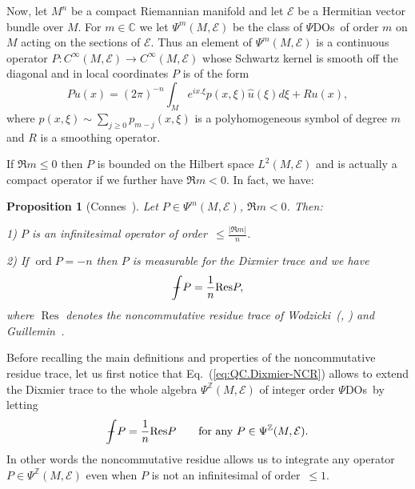 \documentclass[leqno, 10pt]{amsart}
\newtheorem{proposition}[definition]{Proposition}
\theoremstyle{remark}
\begin{document}
Now, let $M^{n}$ be a compact Riemannian manifold and let ${{\ensuremath{\mathcal{{E}}}}}$ be a Hermitian vector bundle over $M$. For $m \in {\ensuremath{\mathbb{C}}}$ we let $\Psi^{m}(M,{{\ensuremath{\mathcal{{E}}}}})$ be the 
class of {$\Psi$DOs}\ of order $m$ on $M$ acting on the sections of ${{\ensuremath{\mathcal{{E}}}}}$. Thus an element of $\Psi^{m}(M,{{\ensuremath{\mathcal{{E}}}}})$ is a continuous operator 
$P:C^{\infty}(M,{{\ensuremath{\mathcal{{E}}}}})\rightarrow C^{\infty}(M,{{\ensuremath{\mathcal{{E}}}}})$ whose Schwartz kernel is smooth off the diagonal and in local coordinates $P$ is of the form
\begin{equation}
    Pu(x)=(2\pi)^{-n}\int_{M}e^{ix.\xi}p(x,\xi)\hat{u}(\xi)d\xi +Ru(x),
\end{equation}
where $p(x,\xi)\sim \sum_{j\geq 0} p_{m-j}(x,\xi)$ is a polyhomogeneous symbol of degree $m$ and $R$ is a smoothing operator. 

If $\Re m\leq 0$ then $P$ is bounded on the Hilbert space $L^{2}(M,{{\ensuremath{\mathcal{{E}}}}})$ and is actually a compact operator if we further have $\Re m<0$. In fact, we have: 

\begin{proposition}[Connes~\cite{Co:AFNCG}]\label{prop:QC.Dixmier-trace} 
    Let $P\in \Psi^{m}(M,{{\ensuremath{\mathcal{{E}}}}})$, $\Re m<0$. Then:\smallskip
    
    1) $P$ is an infinitesimal operator of order~$\leq \frac{|\Re m|}{n}$.\smallskip
    
    2) If ${{{\operatorname{{ord}}}}} P=-n$ then $P$ is measurable for the Dixmier trace and we have 
    \begin{equation}
        {\ensuremath{-\hspace{-2,4ex}\int}} P= \frac{1}{n} {\ensuremath{{\operatorname{{Res}}}}} P,
        \label{eq:QC.Dixmier-NCR}
    \end{equation}
    where ${\ensuremath{{\operatorname{{Res}}}}} $ denotes the noncommutative residue trace of Wodzicki~(\cite{Wo:LISA}, \cite{Wo:NCRF}) and Guillemin~\cite{Gu:NPWF}. 
\end{proposition}

Before recalling the main definitions and properties of the noncommutative residue trace, let us first notice that Eq.~(\ref{eq:QC.Dixmier-NCR}) 
allows to  extend the Dixmier trace to the whole algebra ${\ensuremath{\Psi^{\ensuremath{\mathbb{Z}}}}}(M,{{\ensuremath{\mathcal{{E}}}}})$  of integer order {$\Psi$DOs}\ by letting
\begin{equation}
    {\ensuremath{-\hspace{-2,4ex}\int}} P= \frac{1}{n}{\ensuremath{{\operatorname{{Res}}}}} P \qquad \text{for any $P\in {\ensuremath{\Psi^{\ensuremath{\mathbb{Z}}}}}(M,{{\ensuremath{\mathcal{{E}}}}})$}.
    \label{eq:QC.extension-Dixmier-trace}
\end{equation}
In other words the noncommutative residue allows us to integrate any operator $P\in {\ensuremath{\Psi^{\ensuremath{\mathbb{Z}}}}}(M,{{\ensuremath{\mathcal{{E}}}}})$ even when $P$ is not an infinitesimal of order~$\leq 1$.
\end{document}
